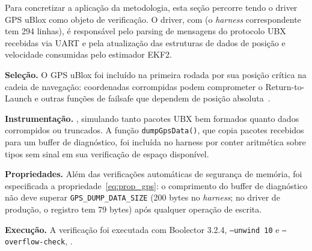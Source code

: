 Para concretizar a aplicação da metodologia, esta seção percorre
 tendo o driver GPS uBlox como objeto de verificação. O driver,
com  (o \textit{harness}
correspondente tem 294 linhas), é responsável pelo parsing de mensagens
do protocolo UBX recebidas via UART e pela atualização das estruturas de dados de
posição e velocidade consumidas pelo estimador EKF2.

\textbf{Seleção.} O GPS uBlox foi incluído na primeira rodada por sua posição
crítica na cadeia de navegação: coordenadas corrompidas podem comprometer o
Return-to-Launch e outras funções de failsafe que dependem de posição
absoluta~\cite{Wanner2024}.

\textbf{Instrumentação.} , simulando tanto pacotes UBX bem formados
quanto dados corrompidos ou truncados. A função \texttt{dumpGpsData()}, que copia
pacotes recebidos para um buffer de diagnóstico, foi incluída no harness por
conter aritmética sobre tipos sem sinal em sua verificação de espaço disponível.

\textbf{Propriedades.} Além das verificações automáticas de segurança de
memória, foi especificada a propriedade~\eqref{eq:prop_gps}: o comprimento do
buffer de diagnóstico não deve superar \texttt{GPS\_DUMP\_DATA\_SIZE} (200
bytes no \textit{harness}; no driver de produção, o registro tem 79 bytes)
após qualquer operação de escrita.

\textbf{Execução.} A verificação foi executada com Boolector 3.2.4,
\texttt{--unwind 10} e \texttt{--overflow-check}, .

